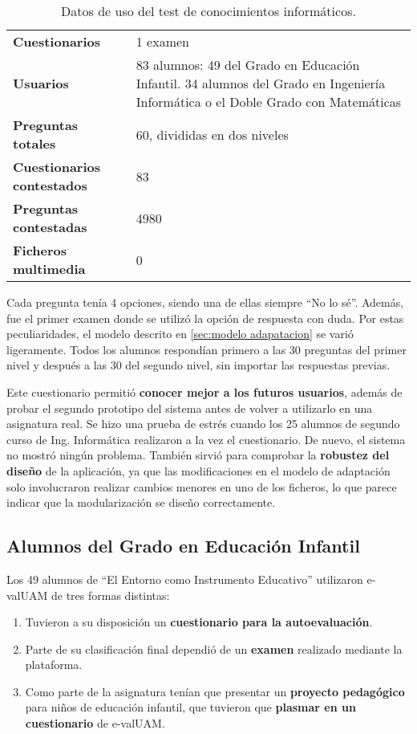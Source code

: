 \begin{table}[hc]
	\centering
	\begin{tabular}{l|p{10cm}}
		{\bf Cuestionarios}             & 1 examen \\ 
		{\bf Usuarios}                  & 83 alumnos: 49 del Grado en Educación Infantil. 34 alumnos del Grado en Ingeniería Informática o el Doble Grado con Matemáticas \\
		{\bf Preguntas totales}         & 60, divididas en dos niveles    \\ 
		{\bf Cuestionarios contestados} & 83                              \\ 
		{\bf Preguntas contestadas}     & 4980                             \\ 
		{\bf Ficheros multimedia}		& 0							   \\
	\end{tabular}
	\caption{Datos de uso del test de conocimientos inform\'aticos.}
\end{table}

Cada pregunta tenía 4 opciones, siendo una de ellas siempre ``No lo sé''. Además, fue el primer examen donde se utilizó la opción de respuesta con duda. Por estas peculiaridades, el modelo descrito en \ref{sec:modelo adapatacion} se varió ligeramente. Todos los alumnos respondían primero a las 30 preguntas del primer nivel y después a las 30 del segundo nivel, sin importar las respuestas previas.

Este cuestionario permitió \textbf{conocer mejor a los futuros usuarios}, además de probar el segundo prototipo del sistema antes de volver a utilizarlo en una asignatura real. Se hizo una prueba de estrés cuando los 25 alumnos de segundo curso de Ing. Informática realizaron a la vez el cuestionario. De nuevo, el sistema no mostró ningún problema. También sirvió para comprobar la \textbf{robustez del diseño} de la aplicación, ya que las modificaciones en el modelo de adaptación solo involucraron realizar cambios menores en uno de los ficheros, lo que parece indicar que la modularización se diseño correctamente.

\subsection{Alumnos del Grado en Educación Infantil}

Los 49 alumnos de ``El Entorno como Instrumento Educativo'' utilizaron \acrshort{e-valUAM} de tres formas distintas:

\begin{enumerate}
 	\item Tuvieron a su disposición un \textbf{cuestionario para la autoevaluación}. 
 	\item Parte de su clasificación final dependió de un \textbf{examen} realizado mediante la plataforma. 
 	\item Como parte de la asignatura tenían que presentar un \textbf{proyecto pedagógico} para niños de educación infantil, que tuvieron que \textbf{plasmar en un cuestionario} de \acrshort{e-valUAM}. 
\end{enumerate}


